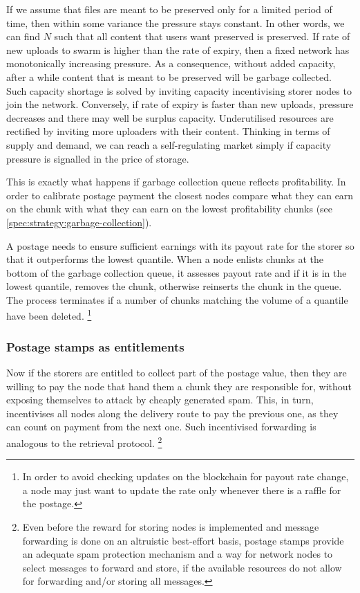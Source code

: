 If we assume that files are meant to be preserved only for a limited period of time, then within some variance the pressure stays constant. In other words, we can find $N$ such that all content that users want preserved is preserved. If rate of new uploads to swarm is higher than the rate of expiry, then a fixed network has monotonically increasing pressure. As a consequence, without added capacity, after a while content that is meant to be preserved will be garbage collected. Such capacity shortage is solved by inviting capacity incentivising storer nodes to join the network. Conversely, if rate of expiry is faster than new uploads, pressure decreases and there may well be surplus capacity. Underutilised resources are rectified by inviting more uploaders with their content. Thinking in terms of supply and demand, we can reach a self-regulating market simply if capacity pressure is signalled in the price of storage. 

This is exactly what happens if garbage collection queue reflects profitability. In order to calibrate postage payment the closest nodes compare what they can earn on the chunk with what they can earn on the lowest profitability chunks (see \ref{spec:strategy:garbage-collection}).

A postage needs to ensure sufficient earnings with its payout rate for the storer so that it outperforms the lowest quantile. When a node enlists chunks at the bottom of the garbage collection queue, it assesses payout rate and if it is in the lowest quantile, removes the chunk, otherwise reinserts the chunk in the queue. The process terminates if a number of chunks matching the volume of a quantile have been deleted.%
%
\footnote{In order to avoid checking updates on the blockchain for payout rate change, a node may just want to update the rate only whenever there is a raffle for the postage.}



\subsubsection{Postage stamps as entitlements}

Now if the storers are entitled to collect part of the postage value, then they are willing to pay the node that hand them a chunk they are responsible for, without exposing themselves to attack by cheaply generated spam. This, in turn, incentivises all nodes along the delivery route to pay the previous one, as they can count on payment from the next one. Such incentivised forwarding is analogous to the retrieval protocol.%
%
\footnote{Even before the reward for storing nodes is implemented and message forwarding is done on an altruistic best-effort basis, postage stamps provide an adequate spam protection mechanism and a way for network nodes to select messages to forward and store, if the available resources do not allow for forwarding and/or storing all messages.}
%

